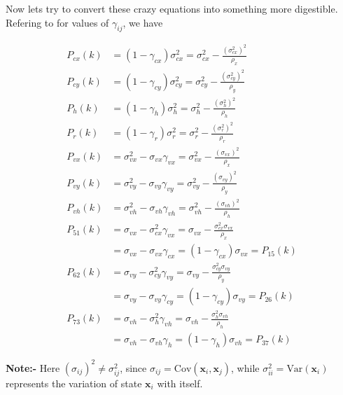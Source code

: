 \documentclass[10pt]{article}
\begin{document}
    \noindent Now lets try to convert these crazy equations into something more digestible. Refering to  for values of \(\gamma_{ij}\), we have

    \begin{align*}
        P_{cx}(k) &= (1 - \gamma_{cx})\sigma^2_{cx} = \sigma^2_{cx} - \frac{(\sigma^2_{cx})^2}{\rho_x} \\
        P_{cy}(k) &= (1 - \gamma_{cy})\sigma^2_{cy} = \sigma^2_{cy} - \frac{(\sigma^2_{cy})^2}{\rho_y} \\
        P_h(k) &= (1 - \gamma_h)\sigma^2_h = \sigma^2_h - \frac{(\sigma^2_h)^2}{\rho_h} \\
        P_r(k) &= (1 - \gamma_r)\sigma^2_r = \sigma^2_r - \frac{(\sigma^2_r)^2}{\rho_r} \\
        P_{vx}(k) &= \sigma^2_{vx} - \sigma_{vx}\gamma_{vx} = \sigma^2_{vx} - \frac{(\sigma_{vx})^2}{\rho_{x}} \\
        P_{vy}(k) &= \sigma^2_{vy} - \sigma_{vy}\gamma_{vy} = \sigma^2_{vy} - \frac{(\sigma_{vy})^2}{\rho_{y}} \\
        P_{vh}(k) &= \sigma^2_{vh} - \sigma_{vh}\gamma_{vh} = \sigma^2_{vh} - \frac{(\sigma_{vh})^2}{\rho_{h}} \\
        P_{51}(k) &= \sigma_{vx} - \sigma^2_{cx}\gamma_{vx} = \sigma_{vx} - \frac{\sigma^2_{cx}\sigma_{vx}}{\rho_x} \\ 
                  &= \sigma_{vx} - \sigma_{vx}\gamma_{cx} = (1 - \gamma_{cx})\sigma_{vx} = P_{15}(k) \\
        P_{62}(k) &= \sigma_{vy} - \sigma^2_{cy}\gamma_{vy} = \sigma_{vy} - \frac{\sigma^2_{cy}\sigma_{vy}}{\rho_y} \\
                  &= \sigma_{vy} - \sigma_{vy}\gamma_{cy} = (1 - \gamma_{cy})\sigma_{vy} = P_{26}(k) \\
        P_{73}(k) &= \sigma_{vh} - \sigma^2_h\gamma_{vh} = \sigma_{vh} - \frac{\sigma^2_h\sigma_{vh}}{\rho_h} \\
                  &= \sigma_{vh} - \sigma_{vh}\gamma_h = (1 - \gamma_h)\sigma_{vh} = P_{37}(k)
    \end{align*}

    \noindent \textbf{Note:-} Here \((\sigma_{ij})^2 \not= \sigma^2_{ij}\), since \(\sigma_{ij} = \text{Cov}(\mathbf{x}_i, \mathbf{x}_j)\), while \(\sigma^2_{ii} = \text{Var}(\mathbf{x}_i)\) 
    represents the variation of state \(\mathbf{x}_i\) with itself.
\end{document}
